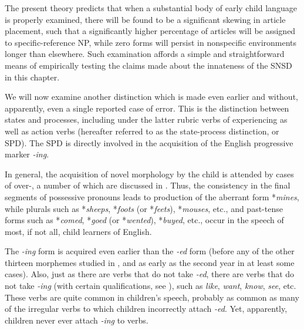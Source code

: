The present theory predicts that when a substantial body of early child language is properly examined, there will be found to be a significant skewing in article placement, such that a significantly higher percentage of articles will be assigned to specific-reference NP, while zero forms will persist in nonspecific environments longer than elsewhere. Such examination affords a simple and straightforward means of empirically testing the claims made about\enlargethispage{1\baselineskip} the innateness of the SNSD in this chapter.

We will now examine another distinction which is made even earlier and without, apparently, even a single reported case of error. This is the distinction between states and processes, including under the latter rubric verbs of experiencing as well as action verbs (hereafter referred to as the state-process distinction, or SPD). The SPD is di\-rectly involved in the acquisition of the English progressive marker \textit{-ing}.

In general, the acquisition of novel morphology by the child is attended by cases of over-, a number of which are dis\-cussed in \citet{Cazden1968}. Thus, the consistency in the final segments of possessive pronouns leads to production of the aberrant form *\textit{mines}, while plurals such as *\textit{sheeps}, *\textit{foots} (or *\textit{feets}), *\textit{mouses}, etc., and past-tense forms such as *\textit{comed}, *\textit{goed} (or *\textit{wented}), *\textit{buyed}, etc., occur in the speech of most, if not all, child learners of English.

The \textit{-ing} form is acquired even earlier than the \textit{-ed} form (before any of the other thirteen morphemes studied in \citet{Brown1973}, and as early as the second year in at least some cases). Also, just as there are verbs that do not take \textit{-ed}, there are verbs that do not take \textit{-ing} (with certain qualifications, see \citealt{Sag1973}), such as \textit{like}, \textit{want}, \textit{know}, \textit{see}, etc. These verbs are quite common in children's speech, probably as common as many of the irregular verbs to which children incor\-rectly attach \textit{-ed}. Yet, apparently, children never ever attach \textit{-ing} to  verbs.

